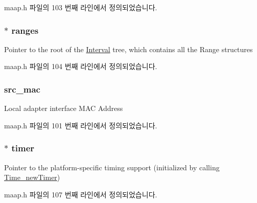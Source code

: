 maap.\+h 파일의 103 번째 라인에서 정의되었습니다.

\subsubsection[{\texorpdfstring{ranges}{ranges}}]{$\ast$ ranges}\hypertarget{struct_maap___client_a415d09d180ac60757c9f10728fd42e8a}{}\label{struct_maap___client_a415d09d180ac60757c9f10728fd42e8a}
Pointer to the root of the \hyperlink{intervals_8h_af6f1ab89800839a9266a6dd11c2bc7ce}{Interval} tree, which contains all the Range structures 

maap.\+h 파일의 104 번째 라인에서 정의되었습니다.

\subsubsection[{\texorpdfstring{src\+\_\+mac}{src_mac}}]{ src\+\_\+mac}\hypertarget{struct_maap___client_ae2c98c9078f80f770e85f937c34da4eb}{}\label{struct_maap___client_ae2c98c9078f80f770e85f937c34da4eb}
Local adapter interface M\+AC Address 

maap.\+h 파일의 101 번째 라인에서 정의되었습니다.

\subsubsection[{\texorpdfstring{timer}{timer}}]{$\ast$ timer}\hypertarget{struct_maap___client_ad59f2b60cccbf7bd6a43003017d1d01a}{}\label{struct_maap___client_ad59f2b60cccbf7bd6a43003017d1d01a}
Pointer to the platform-\/specific timing support (initialized by calling \hyperlink{maap__timer__windows_8c_a23def05c4f6e554efc16883198bae8dc}{Time\+\_\+new\+Timer}) 

maap.\+h 파일의 107 번째 라인에서 정의되었습니다.

